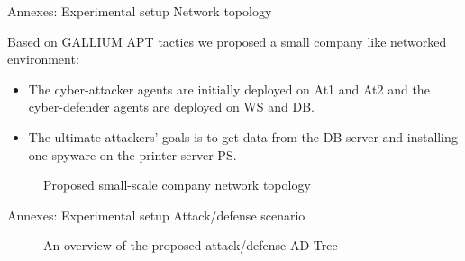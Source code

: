 	\begin{frame}{Annexes: Experimental setup}
		{Network topology}

        Based on GALLIUM APT tactics we proposed a small company like networked environment:
        \begin{itemize}
            \item The cyber-attacker agents are initially deployed on At1 and At2 and the cyber-defender agents are deployed on WS and DB.
            \item The ultimate attackers' goals is to get data from the DB server and installing one spyware on the printer server PS.
        \end{itemize}

        \begin{figure}
            \centering
            
            \caption{Proposed small-scale company network topology}
            \label{fig:scenario_network_topology}
        \end{figure}
 
	\end{frame}


	\begin{frame}{Annexes: Experimental setup}
		{Attack/defense scenario}

        \vspace{-0.15cm}

        \begin{figure}
            \centering
            

            \vspace{-0.2cm}
            
            \caption{An overview of the proposed attack/defense AD Tree}
            \label{fig:ADTree}
        \end{figure}
 
	\end{frame}


